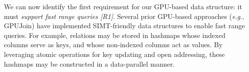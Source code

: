 \documentclass[nonacm,sigplan]{acmart}
\begin{document}
We can now identify the first requirement for our GPU-based data structure: it must \emph{support fast range queries [R1]}. Several prior GPU-based approaches (\emph{e}.\emph{g}., GPUJoin) have implemented SIMT-friendly data structures to enable fast range queries. For example, relations may be stored in hashmaps whose indexed columns serve as keys, and whose non-indexed columns act as values. By leveraging atomic operations for key updating and open addressing, these hashmaps may be constructed in a data-parallel manner.
\end{document}
